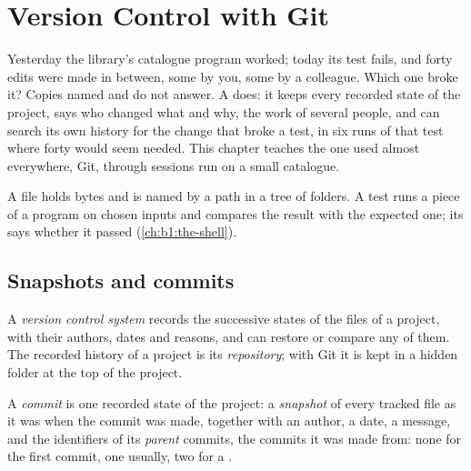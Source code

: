 \chapter{Version Control with Git}\label{ch:b1:version-control}

Yesterday the library's catalogue program worked; today its test fails, and forty edits were made in between, some
by you, some by a colleague. Which one broke it? Copies named  and 
do not answer. A  does: it keeps every recorded state of the project, says who changed what and
why,  the work of several people, and can search its own history for the change that broke a test, in six
runs of that test where forty would seem needed. This chapter teaches the one used almost everywhere, Git, through
sessions run on a small catalogue.

\begin{recall}
A file holds bytes and is named by a path in a tree of folders. A test runs a piece of a program on chosen inputs and
compares the result with the expected one; its  says whether it passed (\cref{ch:b1:the-shell}).
\end{recall}

\section{Snapshots and commits}\label{sec:b1:version-control:commits}

\begin{definition}\label{def:b1:version-control:repository}
A \emph{version control system} records the successive states of the files of a project,
with their authors, dates and reasons, and can restore or compare any of them. The recorded history of a project is
its \emph{repository}; with Git it is kept in a hidden folder  at the top of the project.
\end{definition}

\begin{definition}\label{def:b1:version-control:commit}
A \emph{commit} is one recorded state of the project: a \emph{snapshot} of every
tracked file as it was when the commit was made, together with an author, a date, a message, and the identifiers of
its \emph{parent} commits, the commits it was made from: none for the first commit, one usually, two for a .
\end{definition}

